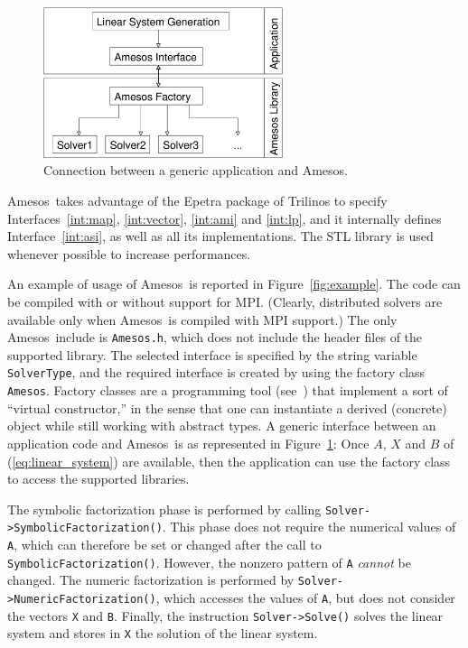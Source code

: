 \documentclass[acmtocl]{acmtrans2m}
\newcommand{\amesos}{{\sc Amesos}}
\begin{document}
\begin{figure}
\begin{center}
\includegraphics[width=7cm]{amesos_and_application.eps}
\end{center}
\caption{Connection between a generic application and \amesos.}
\label{fig:app}
\end{figure}

\amesos\ takes advantage of the {\sc Epetra} package of Trilinos to specify
Interfaces~\ref{int:map}, \ref{int:vector}, \ref{int:ami} and \ref{int:lp}, 
  and it
internally defines Interface~\ref{int:asi}, as well as all its
implementations. The STL library is used whenever possible to increase
performances.

An example of usage of \amesos\ is reported in Figure~\ref{fig:example}. The
code can be compiled with or without support for MPI. (Clearly, distributed
solvers are available only when \amesos\ is compiled with MPI support.) The only
\amesos\ include is \verb!Amesos.h!, which does not include the header files of
the supported library. The selected interface is specified by the string
variable \verb!SolverType!, and the required interface is created by using the
factory class \verb!Amesos!. Factory classes are a programming
tool (see~\cite{alexandrescu01modern}) that implement a sort of ``virtual
constructor,'' in the sense that one can instantiate a derived (concrete) object
while still working with abstract types. A
generic interface between an application code and \amesos\ is as represented in
Figure~\ref{fig:app}: Once $A$, $X$ and $B$ of (\ref{eq:linear_system}) are
available, then the application can use the factory class to access the
supported libraries.

The symbolic factorization phase is
performed by calling \verb!Solver->SymbolicFactorization()!.
This phase does not require the numerical values of \verb!A!, which can
therefore be set or changed after the call to \verb!SymbolicFactorization()!.
However,  the nonzero pattern of \verb!A! {\em cannot} be
changed.
The numeric factorization is performed by
\verb!Solver->NumericFactorization()!, which
accesses the values of \verb!A!, but does not
consider the vectors \verb!X! and \verb!B!. Finally, the instruction
\verb!Solver->Solve()! solves the linear system and stores in \verb!X! the
solution of the linear system.
\end{document}
